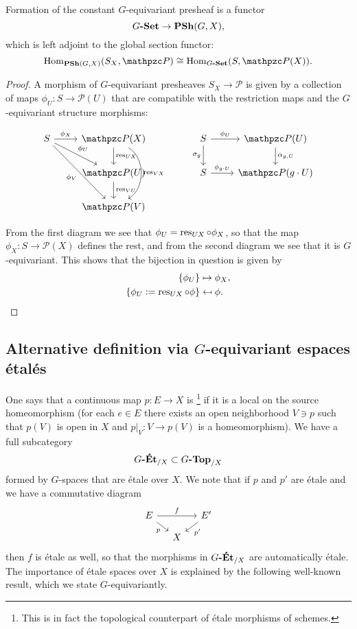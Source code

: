 \begin{observation}
  Formation of the constant $G$-equivariant presheaf is a functor
  $$G\text{\bf -Set} \to \text{\bf PSh} (G,X),$$
  which is left adjoint to the global section functor:
  \[ \Hom_{\categ{PSh} (G,X)} (S_X, \mathcal{P}) \isom
    \Hom_{G\categ{-Set}} (S, \mathcal{P} (X)). \]

  \begin{proof}
    A morphism of $G$-equivariant presheaves $S_X \to \mathcal{P}$ is given by a
    collection of maps $\phi_U\colon S \to \mathcal{P} (U)$ that are compatible
    with the restriction maps and the $G$-equivariant structure morphisms:

    \[ \begin{tikzcd}
        S\ar{r}{\phi_X}\ar{dr}{\phi_U}\ar{ddr}[swap]{\phi_V} & \mathcal{P} (X)\ar[bend left=60]{dd}{\res_{VX}}\ar{d}{\res_{UX}} && S\ar{d}[swap]{\sigma_g}\ar{r}{\phi_U} & \mathcal{P} (U) \ar{d}{\alpha_{g,U}} \\
        & \mathcal{P} (U)\ar{d}{\res_{VU}} && S\ar{r}{\phi_{g\cdot U}} & \mathcal{P} (g\cdot U) \\ & \mathcal{P} (V)
      \end{tikzcd} \]

    From the first diagram we see that $\phi_U = \operatorname{res}_{UX}\circ\phi_X$, so that
    the map $\phi_X\colon S\to \mathcal{P} (X)$ defines the rest, and from the
    second diagram we see that it is $G$-equivariant. This shows that the
    bijection in question is given by
    \begin{align*}
      \{ \phi_U \} & \mapsto \phi_X,\\
      \{ \phi_U \mathrel{\mathop:}= \operatorname{res}_{UX}\circ\phi \} & \mapsfrom \phi.
    \end{align*}
  \end{proof}
\end{observation}

\subsection*{Alternative definition via $G$-equivariant espaces étalés}

One says that a continuous map $p\colon E\to X$ is \footnote{This is
  in fact the topological counterpart of étale morphisms of schemes.} if it is a
local on the source homeomorphism (for each $e\in E$ there exists an open
neighborhood $V\ni p$ such that $p (V)$ is open in $X$ and
$\left.p\right|_V\colon V \to p (V)$ is a homeomorphism). We have a full
subcategory
$$G\text{\bf -Ét}_{/X} \subset G\text{\bf -Top}_{/X}$$
formed by $G$-spaces that are étale over $X$. We note that if $p$ and $p'$ are
étale and we have a commutative diagram
\[ \begin{tikzcd}[row sep=small, column sep=small]
    E\ar{rr}{f}\ar{dr}[swap]{p} && E'\ar{dl}{p'} \\
    & X
\end{tikzcd} \]
then $f$ is étale as well, so that the morphisms in $G\text{\bf -Ét}_{/X}$ are
automatically étale. The importance of étale spaces over $X$ is explained by the
following well-known result, which we state $G$-equivariantly.

